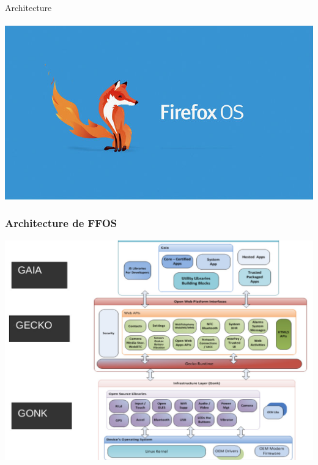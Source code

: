 \documentclass{beamer}
\begin{document}
\begin{frame}
\begin{center}
\Huge{Architecture}
\\~\\
\includegraphics[scale=0.3]{./images/firefox-os.jpg}
\end{center}
\end{frame}
\begin{frame}
\frametitle{Architecture de FFOS}
\begin{center}
\includegraphics[scale=0.3]{./images/ffos_architecture.jpg}
\end{center}
\end{frame}
\end{document}
